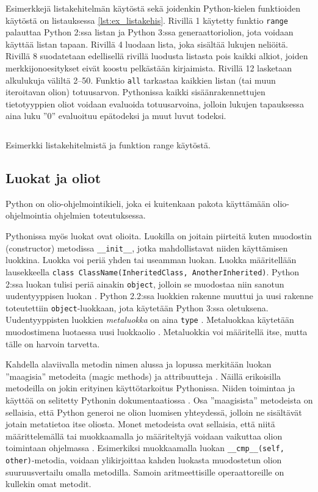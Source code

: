 \documentclass[finnish]{tktltiki2}
\theoremstyle{definition}
\theoremstyle{remark}
\begin{document}
Esimerkkejä listakehitelmän käytöstä sekä joidenkin Python-kielen funktioiden käytöstä on listauksessa \ref{lst:ex_listakehis}. Rivillä 1 käytetty funktio \verb|range| palauttaa Python 2:ssa listan ja Python 3:ssa generaattoriolion, jota voidaan käyttää listan tapaan. Rivillä 4 luodaan lista, joka sisältää lukujen neliöitä. Rivillä 8 suodatetaan edellisellä rivillä luodusta listasta pois kaikki alkiot, joiden merkkijonoesitykset eivät koostu pelkästään kirjaimista. Rivillä 12 lasketaan alkulukuja väliltä 2--50. Funktio \verb|all| tarkastaa kaikkien listan (tai muun iteroitavan olion) totuusarvon. Pythonissa kaikki sisäänrakennettujen tietotyyppien oliot voidaan evaluoida totuusarvoina, jolloin lukujen tapauksessa aina luku ''0'' evaluoituu epätodeksi ja muut luvut todeksi.

\begin{listing}[ht]
    \inputminted[linenos,frame=single,framesep=10pt]{python}{code/luvut.py}
    \caption{Esimerkki listakehitelmistä ja funktion range käytöstä.}
    \label{lst:ex_listakehis}
\end{listing}


\subsection{Luokat ja oliot}

Python on olio-ohjelmointikieli, joka ei kuitenkaan pakota käyttämään olio-ohjelmointia ohjelmien toteutuksessa. 

Pythonissa myös luokat ovat olioita. Luokilla on joitain piirteitä kuten muodostin (constructor) metodissa \verb|__init__|, jotka mahdollistavat niiden käyttämisen luokkina. Luokka voi periä yhden tai useamman luokan. Luokka määritellään lausekkeella \lstinline|class ClassName(InheritedClass, AnotherInherited)|. Python 2:ssa luokan tulisi periä ainakin \verb|object|, jolloin se muodostaa niin sanotun uudentyyppisen luokan \cite[s. 81]{martelli2006python}. Python 2.2:ssa luokkien rakenne muuttui ja uusi rakenne toteutettiin \verb|object|-luokkaan, jota käytetään Python 3:ssa oletuksena. Uudentyyppisten luokkien \emph{metaluokka} on aina \verb|type| \cite[s. 117]{martelli2006python}. Metaluokkaa käytetään muodostimena luotaessa uusi luokkaolio \cite{MetaprogP3}. Metaluokkia voi määritellä itse, mutta tälle on harvoin tarvetta.

Kahdella alaviivalla metodin nimen alussa ja lopussa merkitään luokan ''maagisia'' metodeita (magic methods) ja attribuutteja \cite[s. 104]{martelli2006python}. Näillä erikoisilla metodeilla on jokin erityinen käyttötarkoitus Pythonissa. Niiden toimintaa ja käyttöä on selitetty Pythonin dokumentaatiossa \cite{magic-methods}. Osa ''maagisista'' metodeista on sellaisia, että Python generoi ne olion luomisen yhteydessä, jolloin ne sisältävät jotain metatietoa itse oliosta. Monet metodeista ovat sellaisia, että niitä määrittelemällä tai muokkaamalla jo määriteltyjä voidaan vaikuttaa olion toimintaan ohjelmassa \cite{magic-methods, dive-into-python3}. Esimerkiksi muokkaamalla luokan \verb|__cmp__(self, other)|-metodia, voidaan ylikirjoittaa kahden luokasta muodostetun olion suuruusvertailu omalla metodilla. Samoin aritmeettisille operaattoreille on kullekin omat metodit. 
\end{document}
